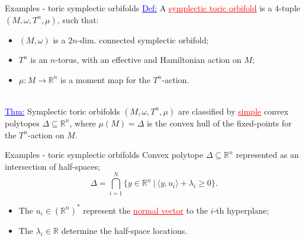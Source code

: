 \documentclass[aspectratio=169,xcolor=dvipsnames]{beamer}
\newcommand{\ra}{\rightarrow}
\newcommand{\RR}{\mathbb{R}}
\newcommand{\w}{\omega}
\begin{document}
\begin{frame}{Examples - toric symplectic orbifolds}
	\textcolor{blue}{\underline{Def:}} A \textcolor{red}{\underline{symplectic toric orbifold}} is a $4$-tuple $(M, \w, T^{n}, \mu)$, such that:
	\begin{itemize}
		\item $(M,\w)$ is a $2n$-dim. connected symplectic orbifold;
		\item $T^{n}$ is an $n$-torus, with an effective and Hamiltonian action on $M$;
		\item $\mu : M \ra \RR^{n}$ is a moment map for the $T^{n}$-action.
	\end{itemize}
	\hfill \\
	\textcolor{blue}{\underline{Thm:}} Symplectic toric orbifolds $(M, \w, T^{n}, \mu)$ are classified by \textcolor{red}{\underline{simple}} convex polytopes $\Delta \subseteq \RR^{n}$, where $\mu(M) = \Delta$ is the convex hull of the fixed-points for the $T^{n}$-action on $M$.
\end{frame}

\begin{frame}{Examples - toric symplectic orbifolds}
	Convex polytope $\Delta \subseteq \RR^{n}$ represented as an intersection of half-spaces;
	\[
		\Delta = \bigcap_{i=1}^{N} \{ y \in \RR^{n}~|~\langle y, u_{i}\rangle + \lambda_{i} \geq 0 \}.
	\]
	\begin{itemize}
		\item The $u_{i} \in (\RR^{n})^{\ast}$ represent the \textcolor{red}{\underline{normal vector}} to the $i$-th hyperplane;
		\item The $\lambda_{i} \in \RR$ determine the half-space locations.
	\end{itemize}

	\begin{figure}[h!]
		\centering
	\end{figure}
\end{frame}
\end{document}
